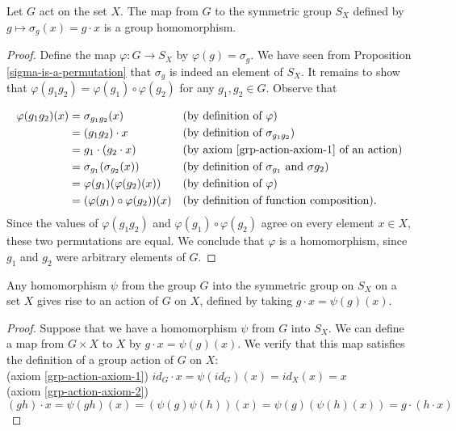 \begin{prop}\label{action-yields-hom}
Let $G$ act on the set $X$. The map from $G$ to the symmetric group $S_X$ defined by $g \mapsto \sigma_g (x) = g \cdot x$ is a group homomorphism.
\end{prop}
\begin{proof}
Define the map $\varphi \colon G \to S_X$ by $\varphi (g) = \sigma_g$.  We have seen from Proposition \ref{sigma-is-a-permutation} that $\sigma_g$ is indeed an element of $S_X$.  It remains to show that $\varphi(g_1 g_2) = \varphi(g_1) \circ \varphi(g_2)$ for any $g_1, g_2 \in G$.  Observe that

\begin{align*}
\varphi(g_1 g_2)(x) &= \sigma_{g_1 g_2} (x) && \text{(by definition of $\varphi$)} \\
			&= (g_1 g_2) \cdot x && \text{(by definition of $\sigma_{g_1 g_2}$)} \\
			&= g_1 \cdot (g_2 \cdot x) && \text{(by axiom \ref{grp-action-axiom-1} of an action)} \\
			&= \sigma_{g_1} ( \sigma_{g_2} (x)) && \text{(by definition of $\sigma_{g_1}$ and  $\sigma{g_2}$)} \\
			&= \varphi(g_1) ( \varphi(g_2) (x)) && \text{(by definition of $\varphi$)}\\
			&= (\varphi(g_1) \circ \varphi(g_2)) (x) && \text{(by definition of function composition)}.
\end{align*}
Since the values of $\varphi(g_1 g_2)$ and $\varphi(g_1) \circ \varphi(g_2)$ agree on every element $x \in X$, these two permutations are equal. We conclude that $\varphi$ is a homomorphism, since $g_1$ and $g_2$ were arbitrary elements of $G$.
\end{proof}


\begin{prop} \label{hom-yields-action}
Any homomorphism $\psi$ from the group $G$ into the symmetric group on $S_X$ on a set $X$ gives rise to an action of $G$ on $X$, defined by taking $g \cdot x = \psi(g)(x)$.
\end{prop}
\begin{proof}
Suppose  that we have a homomorphism $\psi$ from $G$ into $S_X$.  We can define a map from $G \times X$ to $X$  by $g \cdot x = \psi(g)(x)$. We verify that this map satisfies the definition of a group action of $G$ on $X$:
\\ (axiom \ref{grp-action-axiom-1}) \quad $id_G \cdot x = \psi(id_G)(x) = id_X(x) = x$
\\(axiom \ref{grp-action-axiom-2}) \quad $(gh) \cdot x = \psi(gh)(x) = (\psi(g)\psi(h))(x) = \psi(g)(\psi(h)(x)) = g \cdot (h \cdot x)$
\end{proof}

